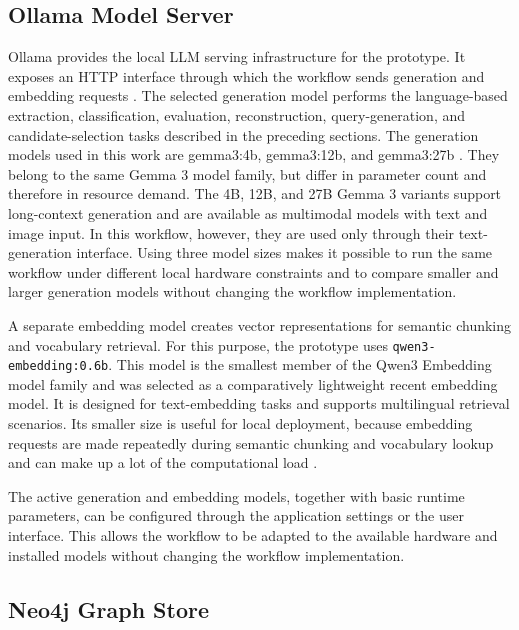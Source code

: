 \subsection{Ollama Model Server}
\label{sec:ollama_model_server}

Ollama provides the local \ac{LLM} serving infrastructure for the prototype.
It exposes an \ac{HTTP} interface through which the workflow sends generation and embedding requests \cite{ollamaplatform}.
The selected generation model performs the language-based extraction, classification, evaluation, reconstruction, query-generation, and candidate-selection tasks described in the preceding sections.
The generation models used in this work are gemma3:4b, gemma3:12b, and gemma3:27b \cite{gemma3technicalreport}.
They belong to the same Gemma 3 model family, but differ in parameter count and therefore in resource demand.
The 4B, 12B, and 27B Gemma 3 variants support long-context generation and are available as multimodal models with text and image input.
In this workflow, however, they are used only through their text-generation interface.
Using three model sizes makes it possible to run the same workflow under different local hardware constraints and to compare smaller and larger generation models without changing the workflow implementation.

A separate embedding model creates vector representations for semantic chunking and vocabulary retrieval.
For this purpose, the prototype uses \texttt{qwen3-embedding:0.6b}.
This model is the smallest member of the Qwen3 Embedding model family and was selected as a comparatively lightweight recent embedding model.
It is designed for text-embedding tasks and supports multilingual retrieval scenarios.
Its smaller size is useful for local deployment, because embedding requests are made repeatedly during semantic chunking and vocabulary lookup and can make up a lot of the computational load \cite{qwen3embedding2025}.

The active generation and embedding models, together with basic runtime parameters, can be configured through the application settings or the user interface.
This allows the workflow to be adapted to the available hardware and installed models without changing the workflow implementation.

\subsection{Neo4j Graph Store}
\label{sec:neo4j_graph_store}

